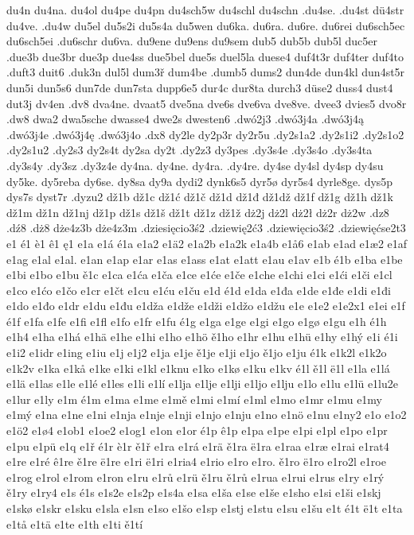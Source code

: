 du4n
du4na.
du4ol
du4pe
du4pn
du4sch5w
du4schl
du4schn
.du4se.
.du4st
dü4str
du4ve.
.du4w
du5el
du5s2i
du5s4a
du5wen
du6ka.
du6ra.
du6re.
du6rei
du6sch5ec
du6sch5ei
.du6schr
du6va.
du9ene
du9ens
du9sem
dub5
dub5b
dub5l
duc5er
.due3b
due3br
due3p
due4ss
due5bel
due5s
duel5la
duese4
duf4t3r
duf4ter
duf4to
.duft3
duit6
.duk3n
dul5l
dum3ř
dum4be
.dumb5
dums2
dun4de
dun4kl
dun4st5r
dun5i
dun5s6
dun7de
dun7sta
dupp6e5
dur4c
dur8ta
durch3
düse2
duss4
dust4
dut3j
dv4en
.dv8
dva4ne.
dvaat5
dve5na
dve6s
dve6va
dve8ve.
dvee3
dvies5
dvo8r
.dw8
dwa2
dwa5sche
dwasse4
dwe2s
dwesten6
.dwó2j3
.dwó3j4a
.dwó3j4ą
.dwó3j4e
.dwó3j4ę
.dwó3j4o
.dx8
dy2le
dy2p3r
dy2r5u
.dy2s1a2
.dy2s1i2
.dy2s1o2
.dy2s1u2
.dy2s3
dy2s4t
dy2sa
dy2t
.dy2z3
dy3pes
.dy3s4e
.dy3s4o
.dy3s4ta
.dy3s4y
.dy3sz
.dy3z4e
dy4na.
dy4ne.
dy4ra.
.dy4re.
dy4se
dy4sl
dy4sp
dy4su
dy5ke.
dy5reba
dy6se.
dy8sa
dy9a
dydi2
dynk6s5
dyr5ø
dyr5s4
dyrle8ge.
dys5p
dys7s
dyst7r
.dyzu2
dž1b
dž1c
dž1ć
dž1č
dž1d
dž1đ
dž1dž
dž1f
dž1g
dž1h
dž1k
dž1m
dž1n
dž1nj
dž1p
dž1s
dž1š
dž1t
dž1z
dž1ž
dż2j
dż2l
dż2ł
dż2r
dż2w
.dz8
.dź8
.dż8
dże4z3b
dże4z3m
.dziesięcio3ś2
.dziewię2ć3
.dziewięcio3ś2
.dziewięćse2t3
e1
é1
è1
ê1
ę1
e1a
e1á
é1a
e1a2
e1ä2
e1a2b
e1a2k
e1a4b
e1å6
e1ab
e1ad
e1æ2
e1af
e1ag
e1al
e1al.
e1an
e1ap
e1ar
e1as
e1ass
e1at
e1att
e1au
e1av
e1b
é1b
e1ba
e1be
e1bi
e1bo
e1bu
ě1c
e1ca
e1ća
e1ča
e1ce
e1će
e1če
e1che
e1chi
e1ci
e1ći
e1či
e1cl
e1co
e1ćo
e1čo
e1cr
e1čt
e1cu
e1ću
e1ču
e1d
é1d
e1da
e1đa
e1de
e1đe
e1di
e1đi
e1do
e1đo
e1dr
e1du
e1đu
e1dža
e1dže
e1dži
e1džo
e1džu
e1e
e1e2
e1e2x1
e1ei
e1f
é1f
e1fa
e1fe
e1fi
e1fl
e1fo
e1fr
e1fu
é1g
e1ga
e1ge
e1gi
e1go
e1gø
e1gu
e1h
é1h
e1h4
e1ha
e1há
e1hä
e1he
e1hi
e1ho
e1hö
ě1ho
e1hr
e1hu
e1hü
e1hy
e1hý
e1i
é1i
e1i2
e1idr
e1ing
e1iu
e1j
e1j2
e1ja
e1je
ě1je
e1ji
e1jo
ě1jo
e1ju
é1k
e1k2l
e1k2o
e1k2v
e1ka
e1kå
e1ke
e1ki
e1kl
e1knu
e1ko
e1kø
e1ku
e1kv
é1l
ě1l
ë1l
e1la
e1lá
e1lä
e1las
e1le
e1lé
e1les
e1li
e1lí
e1lja
e1lje
e1lji
e1ljo
e1lju
e1lo
e1lu
e1lü
e1lu2e
e1lur
e1ly
e1m
é1m
e1ma
e1me
e1mě
e1mi
e1mí
e1ml
e1mo
e1mr
e1mu
e1my
e1mý
e1na
e1ne
e1ni
e1nja
e1nje
e1nji
e1njo
e1nju
e1no
e1nö
e1nu
e1ny2
e1o
e1o2
e1ö2
e1ø4
e1ob1
e1oe2
e1og1
e1on
e1or
é1p
ê1p
e1pa
e1pe
e1pi
e1pl
e1po
e1pr
e1pu
e1pü
e1q
e1ř
é1r
è1r
ě1ř
e1ra
e1rá
e1rä
ě1ra
ë1ra
e1raa
e1ræ
e1rai
e1rat4
e1re
e1ré
ê1re
ě1re
ë1re
e1ri
ë1ri
e1ria4
e1rio
e1ro
e1ro.
ě1ro
ë1ro
e1ro2l
e1roe
e1rog
e1rol
e1rom
e1ron
e1ru
e1rů
e1rü
ě1ru
ě1rů
e1rua
e1rui
e1rus
e1ry
e1rý
ě1ry
e1ry4
e1s
é1s
e1s2e
e1s2p
e1s4a
e1sa
e1ša
e1se
e1še
e1sho
e1si
e1ši
e1skj
e1skø
e1skr
e1sku
e1sla
e1sn
e1so
e1šo
e1sp
e1stj
e1stu
e1su
e1šu
e1t
é1t
ë1t
e1ta
e1tå
e1tä
e1te
e1th
e1ti
ě1tí

